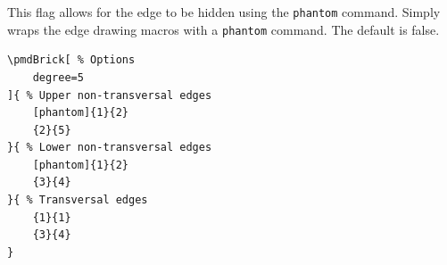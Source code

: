 \documentclass{ltxdoc}
\begin{document}
\begin{center}
\end{center}

This flag allows for the edge to be hidden using the \texttt{phantom} command. Simply wraps the edge drawing macros with a \texttt{phantom} command. The default is false.
\begin{center}
    \begin{minipage}{\dimexpr0.85\textwidth-2\fboxrule-2\fboxsep\relax}
        \begin{minipage}[c]{0.4\linewidth}
\begin{verbatim}
\pmdBrick[ % Options
    degree=5
]{ % Upper non-transversal edges
    [phantom]{1}{2}
    {2}{5}
}{ % Lower non-transversal edges
    [phantom]{1}{2}
    {3}{4}
}{ % Transversal edges
    {1}{1}
    {3}{4}
}
\end{verbatim}
        \end{minipage}
        \hfill
        \begin{minipage}[c]{0.4\linewidth}
        \end{minipage}
    \end{minipage}%
\end{center}
\end{document}

